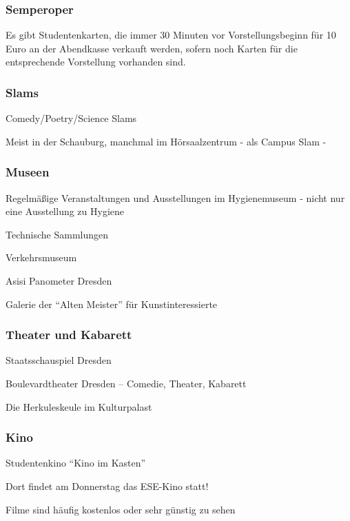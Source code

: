 \documentclass[a4paper,12pt]{report}
\begin{document}
\subsubsection{Semperoper}
\begin{itemize*}
	\item Es gibt Studentenkarten, die immer 30 Minuten vor Vorstellungsbeginn für 10 Euro an der Abendkasse verkauft werden, sofern noch Karten für die entsprechende Vorstellung vorhanden sind.
\end{itemize*}

\subsubsection{Slams}
\begin{itemize*}
	\item Comedy/Poetry/Science Slams
	\item Meist in der Schauburg, manchmal im Hörsaalzentrum - als Campus Slam -
\end{itemize*}

\subsubsection{Museen}
\begin{itemize*}
	\item Regelmäßige Veranstaltungen und Ausstellungen im Hygienemuseum - nicht nur eine Ausstellung zu Hygiene
	\item Technische Sammlungen
	\item Verkehrsmuseum 
	\item Asisi Panometer Dresden
	\item Galerie der \enquote{Alten Meister} für Kunstinteressierte
\end{itemize*}

\subsubsection{Theater und Kabarett}
\begin{itemize*}
	\item Staatsschauspiel Dresden
	\item Boulevardtheater Dresden -- Comedie, Theater, Kabarett
	\item Die Herkuleskeule im Kulturpalast
\end{itemize*}

\subsubsection{Kino}
\begin{itemize*}
	\item Studentenkino \enquote{Kino im Kasten}
	\item Dort findet am Donnerstag das ESE-Kino statt!
	\item Filme sind häufig kostenlos oder sehr günstig zu sehen
\end{itemize*}
\end{document}
